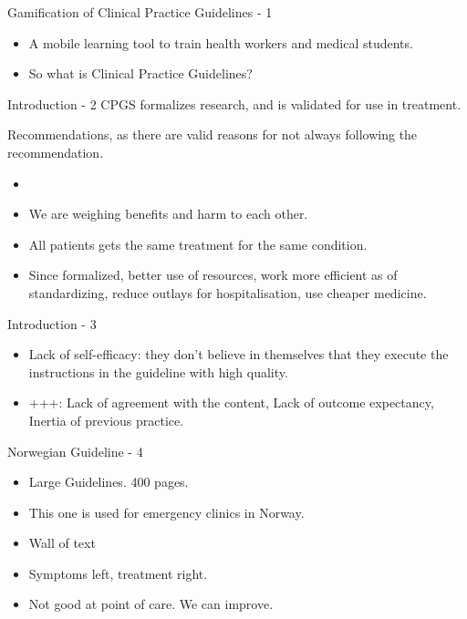 \documentclass{beamer}
\begin{document}
	
	\begin{frame}{Gamification of Clinical Practice Guidelines - 1}
	\begin{itemize}
		\item A mobile learning tool to train health workers and medical students.
		\item So what is Clinical Practice Guidelines?
	\end{itemize}
\end{frame}

\begin{frame}{Introduction - 2}
CPGS formalizes research, and is validated for use in treatment. 

Recommendations, as there are valid reasons for not always following the recommendation.
\begin{itemize}
	\item 
	\item We are weighing benefits and harm to each other.
	\item All patients gets the same treatment for the same condition.
	\item Since formalized, better use of resources, work more efficient as of standardizing, reduce outlays for hospitalisation, use cheaper medicine.
\end{itemize}
\end{frame}

\begin{frame}{Introduction - 3}
\begin{itemize}
	\item  Lack of self-efficacy: they don't believe in themselves that they execute the instructions in the guideline with high quality. 
	\item +++: Lack of agreement with the content, Lack of outcome expectancy, Inertia of previous practice. 
\end{itemize}
\end{frame}

\begin{frame}{Norwegian Guideline - 4}
\begin{itemize}
	\item Large Guidelines. 400 pages.
	\item This one is used for emergency clinics in Norway.
	\item Wall of text
	\item Symptoms left, treatment right.
	\item Not good at point of care. We can improve.
\end{itemize}
\end{frame}
\end{document}
